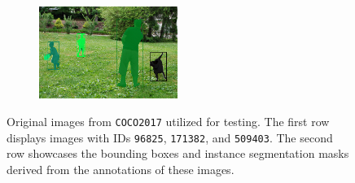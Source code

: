 \begin{figure}[!htbp]
\begin{subfigure}[t]{0.3\textwidth}
\end{subfigure}\hfil %
\begin{subfigure}[t]{0.3\textwidth}
  \includegraphics[height=3cm, width=\linewidth]{figures/segm_bbox/ground_truth/000000509403_segm_bbox.jpeg}
\end{subfigure}
\caption[Original images from \texttt{COCO2017} utilized for testing.]{Original images from \texttt{COCO2017} utilized for testing. The first row displays images with IDs \texttt{96825}, \texttt{171382}, and \texttt{509403}. The second row showcases the bounding boxes and instance segmentation masks derived from the annotations of these images.}
\label{fig:results:originals}
\end{figure}
